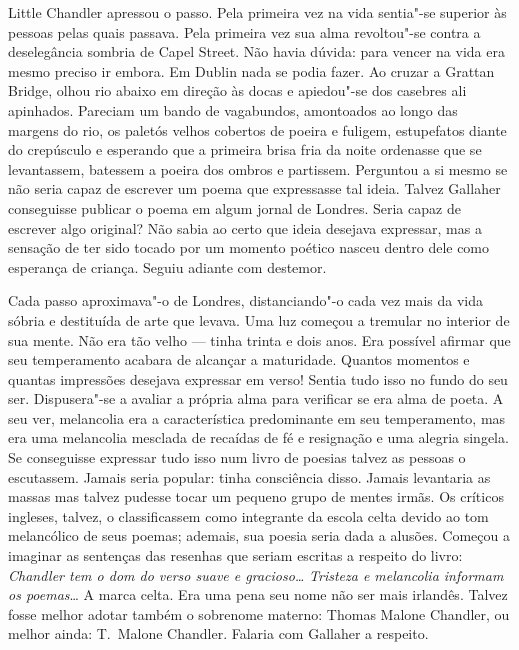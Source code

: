 Little Chandler apressou o passo.  Pela primeira vez na vida sentia"-se superior
às pessoas pelas quais passava.  Pela primeira vez sua alma revoltou"-se contra
a deselegância sombria de Capel Street.  Não havia dúvida: para vencer na vida
era mesmo preciso ir embora.  Em Dublin nada se podia fazer.  Ao cruzar a
Grattan Bridge, olhou rio abaixo em direção às docas e apiedou"-se dos casebres
ali apinhados.  Pareciam um bando de vagabundos, amontoados ao longo das
margens do rio, os paletós velhos cobertos de poeira e fuligem, estupefatos
diante do crepúsculo e esperando que a primeira brisa fria da noite ordenasse
que se levantassem, batessem a poeira dos ombros e partissem.  Perguntou a si
mesmo se não seria capaz de escrever um poema que expressasse tal ideia.
Talvez Gallaher conseguisse publicar o poema em algum jornal de Londres.  Seria
capaz de escrever algo original?  Não sabia ao certo que ideia desejava
expressar, mas a sensação de ter sido tocado por um momento poético nasceu
dentro dele como esperança de criança.  Seguiu adiante com destemor.

Cada passo aproximava"-o de Londres, distanciando"-o cada vez mais da vida sóbria
e destituída de arte que levava.  Uma luz começou a tremular no interior de sua
mente.  Não era tão velho --- tinha trinta e dois anos.  Era possível
afirmar que seu temperamento acabara de alcançar a maturidade.  Quantos
momentos e quantas impressões desejava expressar em verso!  Sentia tudo isso no
fundo do seu ser.  Dispusera"-se a avaliar a própria alma para verificar se era
alma de poeta.  A seu ver, melancolia era a característica predominante em seu
temperamento, mas era uma melancolia mesclada de recaídas de fé e resignação e
uma alegria singela.  Se conseguisse expressar tudo isso num livro de poesias
talvez as pessoas o escutassem.  Jamais seria popular: tinha consciência disso.
Jamais levantaria as massas mas talvez pudesse tocar um pequeno grupo de mentes
irmãs.  Os críticos ingleses, talvez, o classificassem como integrante da
escola celta devido ao tom melancólico de seus poemas; ademais, sua poesia
seria dada a alusões.  Começou a imaginar as sentenças das resenhas que seriam
escritas a respeito do livro: \textit{Chandler tem o dom do verso
suave e gracioso\ldots{}}  \textit{Tristeza e melancolia informam os
poemas}\ldots{ A marca celta}.  Era uma pena seu nome não ser mais irlandês.
Talvez fosse melhor adotar também o sobrenome materno: Thomas Malone Chandler,
ou melhor ainda: T.~Malone Chandler.  Falaria com Gallaher a respeito.

